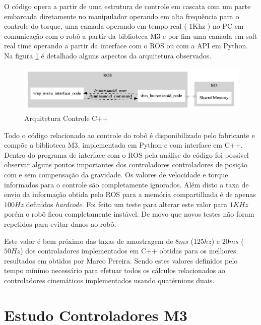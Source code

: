 
O código opera a partir de uma estrutura de controle em cascata com um parte embarcada diretamente no manipulador operando em alta frequência para o controle do torque, uma camada operando em tempo real ( 1Khz ) no PC em comunicação com o robô a partir da biblioteca M3 e por fim uma camada em soft real time operando a partir da interface com o ROS ou com a API em Python. Na figura \ref{fig:shm_arch} é detalhado alguns aspectos da arquitetura observados.

\begin{figure}[H]
    \centering
    \includegraphics[width=1\linewidth]{figs/shm_arch}
    \caption{Arquitetura Controle C++}
    \label{fig:shm_arch}
\end{figure}

Todo o código relacionado ao controle do robô é disponibilizado pelo fabricante e compõe a biblioteca M3, implementada em Python e com interface em C++. Dentro do programa de interface com o ROS pela análise do código foi possível observar alguns pontos importantes dos controladores controladores de posição com e sem compensação da gravidade. Os valores de velocidade e torque informados para o controle são completamente ignorados. Além disto a taxa de envio da informação obtida pelo ROS para a memória compartilhada é de apenas $100Hz$ definidos \textit{hardcode}. Foi feito um teste para alterar este valor para $1KHz$ porém o robô ficou completamente instável. De movo que novos testes não foram repetidos para evitar danos ao robô.

Este valor é bem próximo das taxas de amostragem de $8 ms$ ($125 hz$) e $20 ms$ ($50 Hz$) dos controladores implementados em C++ obtidas para os melhores resultados em \cite{marcosps2016} obtidos por Marco Pereira. Sendo estes valores definidos pelo tempo mínimo necessário para efetuar todos os cálculos relacionados ao controladores cinemáticos implementados usando quatérnions duais.

\section{Estudo Controladores M3}

